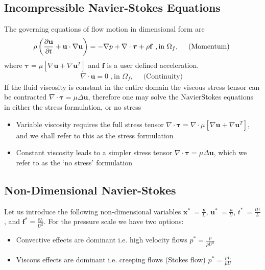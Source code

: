 \documentclass[letterpaper,10pt,english]{sphinxmanual}
\begin{document}
\subsection{Incompressible Navier-Stokes Equations}
\label{\detokenize{theory:intro-ns}}\label{\detokenize{theory:incompressible-navier-stokes-equations}}
The governing equations of flow motion in dimensional form are
\begin{equation}\label{equation:theory:ns_momentum}
\begin{split}\rho\left(\frac{\partial\mathbf u}{\partial t} +\mathbf u \cdot \nabla \mathbf u\right) = - \nabla p + \nabla \cdot \boldsymbol\tau + \rho {\bf f} \,\, , \text{in } \Omega_f , \quad \text{  (Momentum)  }\end{split}
\end{equation}
where \(\boldsymbol\tau=\mu[\nabla \mathbf u+\nabla \mathbf u^{T}]\) and \(\mathbf f\) is a user defined acceleration.
\begin{equation}\label{equation:theory:ns_cont}
\begin{split}\nabla \cdot \mathbf u =0 \,\, , \text{in } \Omega_f, \quad \text{  (Continuity)  }\end{split}
\end{equation}
If the fluid viscosity is constant in the entire domain the viscous stress tensor can be contracted
\(\nabla\cdot\boldsymbol\tau=\mu\Delta \mathbf u\), therefore one may solve the Navier\textendash{}Stokes equations
in either the stress formulation, or no stress
\begin{itemize}
\item {} 
Variable viscosity requires the full stress tensor \(\nabla \cdot \boldsymbol\tau=\nabla \cdot
\mu[\nabla \mathbf u+\nabla \mathbf u^{T}]\), and we shall refer to this as the stress formulation

\item {} 
Constant viscosity leads to a simpler stress tensor \(\nabla \cdot \boldsymbol\tau=\mu\Delta \mathbf u\),
which we refer to as the ‘no stress’ formulation

\end{itemize}


\subsection{Non-Dimensional Navier-Stokes}
\label{\detokenize{theory:intro-ns-nondim}}\label{\detokenize{theory:non-dimensional-navier-stokes}}
Let us introduce the following non-dimensional variables \(\mathbf x^*\ = \frac{\mathbf x}{L}\),
\(\mathbf u^*\ = \frac{u}{U}\), \(t^*\ = \frac{tU}{L}\), and \(\mathbf f^* =\frac{\mathbf f L}{U^2}\).  For the pressure scale we have
two options:
\begin{itemize}
\item {} 
Convective effects are dominant i.e. high velocity flows \(p^* = \frac{p}{\rho U^2}\)

\item {} 
Viscous effects are dominant i.e. creeping flows (Stokes flow) \(p^* = \frac{p L}{\mu U}\)

\end{itemize}
\end{document}

